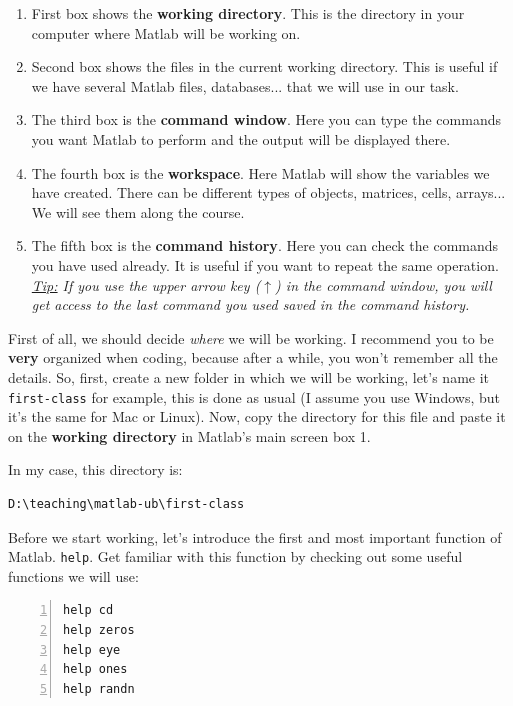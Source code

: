 \documentclass[a4paper,11pt]{article}
\begin{document}
\begin{enumerate}
	\item First box shows the \textbf{working directory}. This is the directory in your computer where Matlab will be working on.
	\item Second box shows the files in the current working directory. This is useful if we have several Matlab files, databases... that we will use in our task.
	\item The third box is the \textbf{command window}. Here you can type the commands you want Matlab to perform and the output will be displayed there.
	\item The fourth box is the \textbf{workspace}. Here Matlab will show the variables we have created. There can be different types of objects, matrices, cells, arrays... We will see them along the course.
	\item The fifth box is the \textbf{command history}. Here you can check the commands you have used already. It is useful if you want to repeat the same operation. \textit{\underline{Tip:} If you use the upper arrow key ($\uparrow$) in the command window, you will get access to the last command you used saved in the command history.}
\end{enumerate}

First of all, we should decide \textit{where} we will be working. I recommend you to be \textbf{very} organized when coding, because after a while, you won't remember all the details. So, first, create a new folder in which we will be working, let's name it \verb+first-class+ for example, this is done as usual (I assume you use Windows, but it's the same for Mac or Linux). Now, copy the directory for this file and paste it on the \textbf{working directory} in Matlab's main screen box 1.

In my case, this directory is:

\begin{Verbatim}[fontsize = \small]
D:\teaching\matlab-ub\first-class
\end{Verbatim}

Before we start working, let's introduce the first and most important function of Matlab. \verb;help;. Get familiar with this function by checking out some useful functions we will use:

\begin{Verbatim}[numbers = left,fontsize=\small]
help cd
help zeros
help eye
help ones
help randn
\end{Verbatim}
\end{document}
